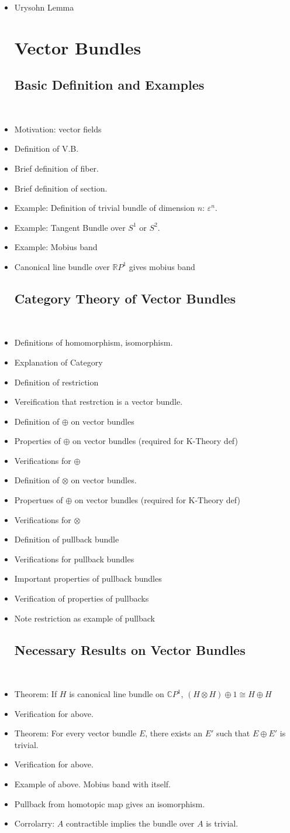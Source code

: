 \documentclass[12]{amsart}
\newcommand{\iso}{\cong} %
\newcommand{\C}{\mathbb{C}}
\newcommand{\R}{\mathbb{R}}
\newcommand{\op}{\oplus}
\newcommand{\ot}{\otimes}
\newcommand{\itemc}{\item[\checkmark]}
\newcommand{\itemp}{\item[$\sim$]}
\newcommand{\itemo}{\item[$\circ$]}
\begin{document}
\begin{itemize}
\subsection{Appendix}~
    \itemo Urysohn Lemma
\section{Vector Bundles} %
\subsection{Basic Definition and Examples}~
	\itemp Motivation: vector fields
    \itemc Definition of V.B.
    \itemc Brief definition of fiber.
    \itemo Brief definition of section.
    \item Example: Definition of trivial bundle of dimension $n$: $\varepsilon^n$.
    \item Example: Tangent Bundle over $S^1$ or $S^2$.
    \item Example: Mobius band
    \itemo Canonical line bundle over $\R P^1$ gives mobius band
\subsection{Category Theory of Vector Bundles}~
    \itemc Definitions of homomorphism, isomorphism. 
    \itemc Explanation of Category
    \item Definition of restriction
    \item Vereification that restrction is a vector bundle.
    \itemc Definition of $\oplus$ on vector bundles
    \itemc Properties of $\oplus$ on vector bundles (required for K-Theory def)
    \itemc Verifications for $\oplus$
    \itemc Definition of $\otimes$ on vector bundles.
    \itemc Propertues of $\oplus$ on vector bundles (required for K-Theory def)
    \itemc Verifications for $\otimes$
    \itemc Definition of pullback bundle
    \itemc Verifications for pullback bundles
   	\itemc Important properties of pullback bundles
    \itemc Verification of properties of pullbacks
    \item Note restriction as example of pullback
\subsection{Necessary Results on Vector Bundles}~
	\item Theorem: If $H$ is canonical line bundle on $\C P^1$, $(H \ot H) \op 1 \iso H \op H$
	\itemo Verification for above.
	\itemc Theorem: For every vector bundle $E$, there exists an $E'$ such that $E \op E'$ is trivial.
	\itemo Verification for above.
	\itemo Example of above. Mobius band with itself.
    \item Pullback from homotopic map gives an isomorphism.
	\item Corrolarry: $A$ contractible implies the bundle over $A$ is trivial.

\end{itemize}
\end{document}

